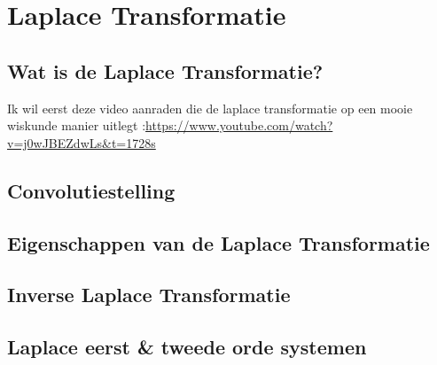 \chapter{Laplace Transformatie}
\label{ch:laplace_transformatie}


\section{Wat is de Laplace Transformatie?}

Ik wil eerst deze video aanraden die de laplace transformatie op een mooie wiskunde manier uitlegt
:\url{https://www.youtube.com/watch?v=j0wJBEZdwLs&t=1728s}


\section{Convolutiestelling}

\section{Eigenschappen van de Laplace Transformatie}

\section{Inverse Laplace Transformatie}

\section{Laplace eerst \& tweede orde systemen}

